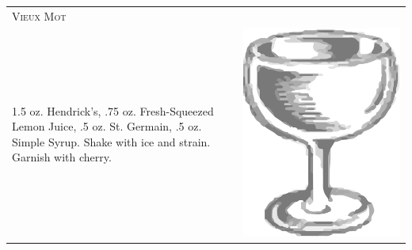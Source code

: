 \documentclass{article}
\begin{document}
\begin{multicols}{2}
\begin{tabular}{p{2in} p{0.5in}}
\multicolumn{2}{p{3in}}{\centering\Huge\textsc{Vieux Mot}} \\ 
   \vspace{-0.1in}1.5 oz. Hendrick's, .75 oz. Fresh-Squeezed Lemon Juice, .5 oz. St. Germain, .5 oz. Simple Syrup. Shake with ice and strain. Garnish with cherry. &
   \vspace{-0.1in} \includegraphics{coupe.png}
\end{tabular}


\end{multicols}
\end{document}
